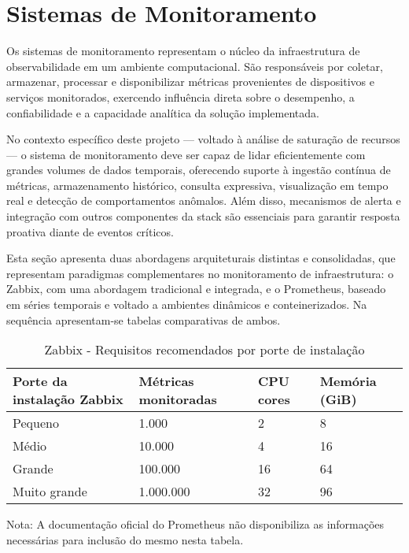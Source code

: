 \section{Sistemas de Monitoramento}
\label{section:SistemasMonitoramento}


{\color{red}

    Os sistemas de monitoramento representam o núcleo da infraestrutura de observabilidade em um ambiente computacional. São responsáveis por coletar, armazenar, processar e disponibilizar métricas provenientes de dispositivos e serviços monitorados, exercendo influência direta sobre o desempenho, a confiabilidade e a capacidade analítica da solução implementada.

    No contexto específico deste projeto — voltado à análise de saturação de recursos — o sistema de monitoramento deve ser capaz de lidar eficientemente com grandes volumes de dados temporais, oferecendo suporte à ingestão contínua de métricas, armazenamento histórico, consulta expressiva, visualização em tempo real e detecção de comportamentos anômalos. Além disso, mecanismos de alerta e integração com outros componentes da stack são essenciais para garantir resposta proativa diante de eventos críticos.

    Esta seção apresenta duas abordagens arquiteturais distintas e consolidadas, que representam paradigmas complementares no monitoramento de infraestrutura: o Zabbix, com uma abordagem tradicional e integrada, e o Prometheus, baseado em séries temporais e voltado a ambientes dinâmicos e conteinerizados. Na sequência apresentam-se tabelas comparativas de ambos.

}

\begin{table}[H]
\centering
\caption{Zabbix - Requisitos recomendados por porte de instalação}
\label{tab:requisitos-zabbix}
\begin{tabular}{@{}p{4cm} p{3cm} p{2.5cm} p{2.5cm}@{}}
\toprule
\textbf{Porte da instalação Zabbix} & \textbf{Métricas monitoradas} & \textbf{CPU cores} & \textbf{Memória (GiB)} \\
\midrule
Pequeno     & 1.000       & 2   & 8   \\
Médio       & 10.000      & 4   & 16  \\
Grande       & 100.000     & 16  & 64  \\
Muito grande & 1.000.000 & 32  & 96  \\
\bottomrule
\end{tabular}
\begin{flushleft}
\footnotesize

Nota: A documentação oficial do Prometheus não disponibiliza as informações necessárias para inclusão do mesmo nesta tabela. 

\end{flushleft}
\end{table}


